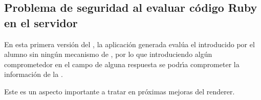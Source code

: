 \subsection{Problema de seguridad al evaluar c\'odigo Ruby en el servidor}
\label{subsec:4.1.3}
\bigskip

En esta primera versi\'on del , la aplicaci\'on generada eval\'ua el  introducido por el alumno sin ning\'un mecanismo de , por lo que introduciendo
alg\'un  comprometedor en el campo de alguna respuesta se podr\'{\i}a comprometer la informaci\'on de la .

Este es un aspecto importante a tratar en pr\'oximas mejoras del renderer.
